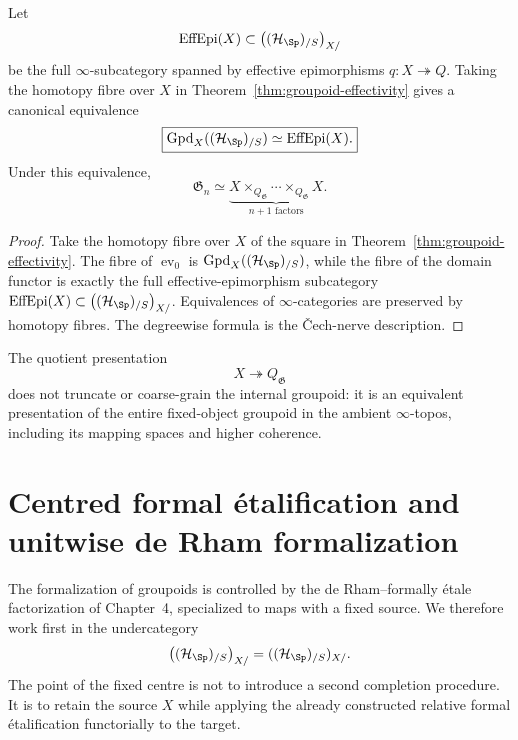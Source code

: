 \begin{proposition}
\label{prop:groupoids-effective-quotients-equivalence}
Let
\[
    \operatorname{EffEpi}(X)
    \subset
    \bigl((\mathcal H_{\Sp})_{/S}\bigr)_{X/}
\]
be the full $\infty$-subcategory spanned by effective epimorphisms
$q:X\twoheadrightarrow Q$.  Taking the homotopy fibre over $X$ in
Theorem~\ref{thm:groupoid-effectivity} gives a canonical equivalence
\[
    \boxed{
    \operatorname{Gpd}_X((\mathcal H_{\Sp})_{/S})
    \simeq
    \operatorname{EffEpi}(X).}
\]
Under this equivalence,
\[
    \mathfrak G_n
    \simeq
    \underbrace{
        X\times_{Q_{\mathfrak G}}\cdots
        \times_{Q_{\mathfrak G}}X
    }_{n+1\text{ factors}}.
\]
\end{proposition}

\begin{proof}
Take the homotopy fibre over $X$ of the square in
Theorem~\ref{thm:groupoid-effectivity}.  The fibre of
$\operatorname{ev}_0$ is $\operatorname{Gpd}_X((\mathcal H_{\Sp})_{/S})$, while the fibre
of the domain functor is exactly the full effective-epimorphism subcategory
$\operatorname{EffEpi}(X)\subset\bigl((\mathcal H_{\Sp})_{/S}\bigr)_{X/}$.  Equivalences of
$\infty$-categories are preserved by homotopy fibres.  The degreewise formula
is the \v{C}ech-nerve description.
\end{proof}

\begin{remark}
\label{rem:quotient-language-primary}
The quotient presentation
\[
    X\twoheadrightarrow Q_{\mathfrak G}
\]
does not truncate or coarse-grain the internal groupoid: it is an equivalent
presentation of the entire fixed-object groupoid in the ambient
$\infty$-topos, including its mapping spaces and higher coherence.
\end{remark}


\section{Centred formal \'etalification and unitwise de Rham formalization}
\label{sec:flg-unitwise-formalization}

The formalization of groupoids is controlled by the de Rham--formally
\'etale factorization of Chapter~4, specialized to maps with a fixed source.
We therefore work first in the undercategory
\[
    \bigl((\mathcal H_{\Sp})_{/S}\bigr)_{X/}
    =
    ((\mathcal H_{\Sp})_{/S})_{X/}.
\]
The point of the fixed centre is not to introduce a second completion
procedure.  It is to retain the source $X$ while applying the already
constructed relative formal \'etalification functorially to the target.

